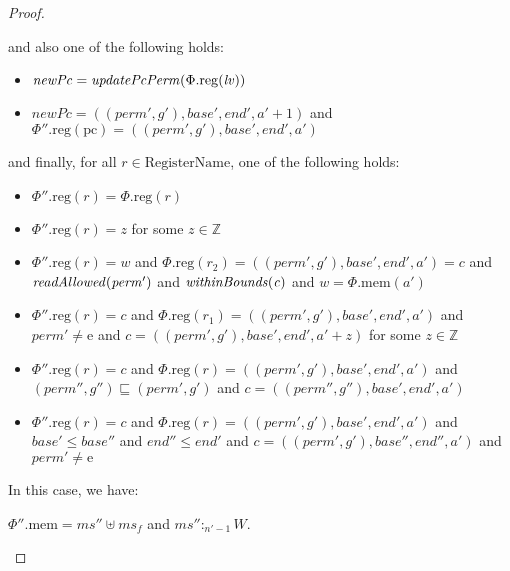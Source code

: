 \documentclass[a4paper]{article}
\newcommand{\update}[2]{[#1 \mapsto #2]}
\newcommand{\var}[1]{\mathit{#1}}
\newcommand{\hs}{\var{ms}}
\newcommand{\ms}{\hs}
\newcommand{\lv}{\var{lv}}
\newcommand{\gl}{\var{g}}
\newcommand{\pcreg}{\mathrm{pc}}
\newcommand{\addr}{\var{a}}
\newcommand{\start}{\var{base}}
\newcommand{\addrend}{\var{end}}
\newcommand{\heap}{\var{mem}}
\newcommand{\perm}{\var{perm}}
\newcommand{\plainproj}[1]{\mathrm{#1}}
\newcommand{\memheap}[1][\Phi]{#1.\plainproj{mem}}
\newcommand{\memreg}[1][\Phi]{#1.\plainproj{reg}}
\newcommand{\plainfun}[2]{
  \ifthenelse{\equal{#2}{}}
  {\mathit{#1}}
  {\mathit{#1}(#2)}
}
\newcommand{\updatePcPerm}[1]{\plainfun{updatePcPerm}{#1}}
\newcommand{\readAllowed}[1]{\plainfun{readAllowed}{#1}}
\newcommand{\writeAllowed}[1]{\plainfun{writeAllowed}{#1}}
\newcommand{\withinBounds}[1]{\plainfun{withinBounds}{#1}}
\newcommand{\heapSat}[3][\heap]{#1 :_{#2} #3}
\newcommand{\plaindom}[1]{\mathrm{#1}}
\newcommand{\RegName}{\plaindom{RegisterName}}
\newcommand{\ints}{\mathbb{Z}}
\newcommand{\plainperm}[1]{\mathrm{#1}}
\newcommand{\entry}{\plainperm{e}}
\begin{document}
\begin{proof}
\begin{enumproof}
    and also one of the following holds:
    \begin{itemize}
    \item $\var{newPc}= \updatePcPerm{\memreg(\lv)}$
    \item $\var{newPc} = ((\perm',\gl'),\start',\addrend',\addr' + 1)$ and
      $\memreg[\Phi''](\pcreg) = ((\perm',\gl'),\start',\addrend',\addr')$
    \end{itemize}
    and finally, for all $r \in \RegName$, one of the following
    holds:
    \begin{itemize}
    \item $\memreg[\Phi''](r) = \memreg[\Phi](r)$
    \item $\memreg[\Phi''](r) = z$ for some $z \in \ints$
    \item $\memreg[\Phi''](r) = \var{w}$ and $\memreg(r_2) =
      ((\perm',\gl'),\start',\addrend',\addr') = \var{c}$ and
      $\readAllowed{\perm'}$ and $\withinBounds{\var{c}}$ and $\var{w} =
      \memheap(\addr')$
    \item $\memreg[\Phi''](r) = \var{c}$ and $\memreg(r_1) =
      ((\perm',\gl'),\start',\addrend',\addr')$ and $\perm' \neq \entry$ and
      $\var{c} = ((\perm',\gl'),\start',\addrend',\addr' + z)$ for some $z \in
      \ints$
    \item $\memreg[\Phi''](r) = \var{c}$ and $\memreg(r) =
      ((\perm',\gl'),\start',\addrend',\addr')$ and $(\perm'',\gl'')\sqsubseteq
      (\perm',\gl')$ and $c = ((\perm'',\gl''),\start',\addrend',\addr')$
    \item $\memreg[\Phi''](r) = \var{c}$ and $\memreg(r) =
      ((\perm',\gl'),\start',\addrend',\addr')$ and $\start' \leq \start''$ and
      $\addrend'' \leq \addrend'$ and $c =
      ((\perm',\gl'),\start'',\addrend'',\addr')$ and $\perm' \neq \entry$
    \end{itemize}
    In this case, we have:
    \begin{enumproof}
    \item $\memheap[\Phi''] = \ms'' \uplus \ms_f$ and $\heapSat[\ms'']{n'-1}{W}$.
\end{enumproof}
\end{enumproof}
\end{proof}
\end{document}
